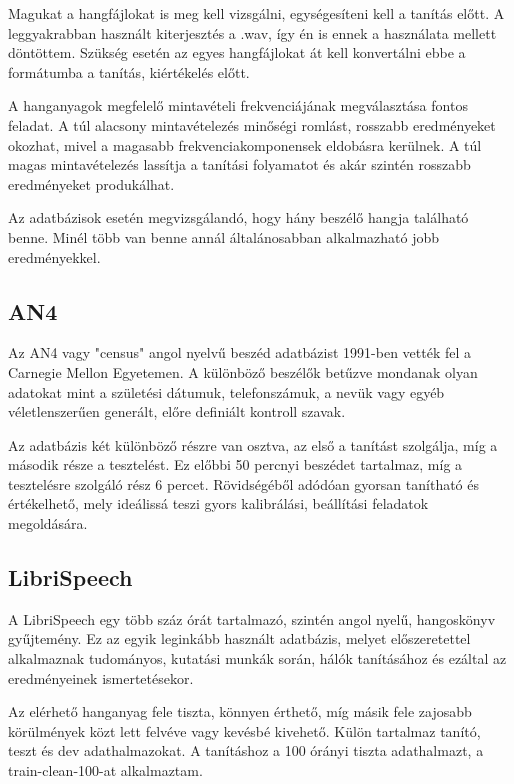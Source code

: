 Magukat a hangfájlokat is meg kell vizsgálni, egységesíteni kell a tanítás előtt. A leggyakrabban használt kiterjesztés a .wav, így én is ennek a használata mellett döntöttem. Szükség esetén az egyes hangfájlokat át kell konvertálni ebbe a formátumba a tanítás, kiértékelés előtt.

A hanganyagok megfelelő mintavételi frekvenciájának megválasztása fontos feladat. A túl alacsony mintavételezés minőségi romlást, rosszabb eredményeket okozhat, mivel a magasabb frekvenciakomponensek eldobásra kerülnek. A túl magas mintavételezés lassítja a tanítási folyamatot és akár szintén rosszabb eredményeket produkálhat.

Az adatbázisok esetén megvizsgálandó, hogy hány beszélő hangja található benne. Minél több van benne annál általánosabban alkalmazható jobb eredményekkel.

\subsection{AN4}

Az AN4\cite{an4} vagy "census" angol nyelvű beszéd adatbázist 1991-ben vették fel a Carnegie Mellon Egyetemen. A különböző beszélők betűzve mondanak olyan adatokat mint a születési dátumuk, telefonszámuk, a nevük vagy egyéb véletlenszerűen generált, előre definiált kontroll szavak.

Az adatbázis két különböző részre van osztva, az első a tanítást szolgálja, míg a második része a tesztelést. Ez előbbi 50 percnyi beszédet tartalmaz, míg a tesztelésre szolgáló rész 6 percet. Rövidségéből adódóan gyorsan tanítható és értékelhető, mely ideálissá teszi gyors kalibrálási, beállítási feladatok megoldására.

\subsection{LibriSpeech}

A LibriSpeech egy több száz órát tartalmazó, szintén angol nyelű, hangoskönyv gyűjtemény. Ez az egyik leginkább használt adatbázis, melyet előszeretettel alkalmaznak tudományos, kutatási munkák során, hálók tanításához és ezáltal az eredményeinek ismertetésekor.

Az elérhető hanganyag fele tiszta, könnyen érthető, míg másik fele zajosabb körülmények közt lett felvéve vagy kevésbé kivehető. Külön tartalmaz tanító, teszt és dev adathalmazokat. A tanításhoz a 100 órányi tiszta adathalmazt, a train-clean-100-at alkalmaztam.

